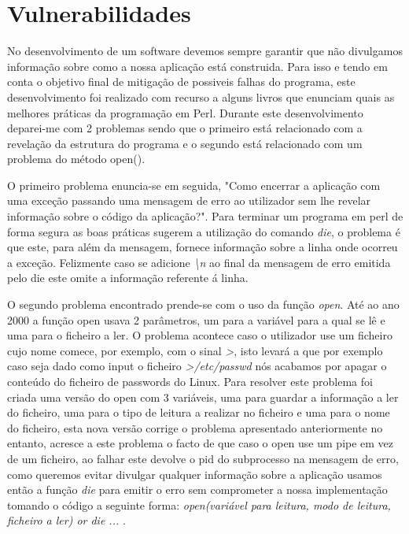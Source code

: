 \section{Vulnerabilidades}

No desenvolvimento de um software devemos sempre garantir que não divulgamos informação sobre como a nossa aplicação está construida. Para isso e tendo em conta o objetivo final de mitigação de possiveis falhas do programa, este desenvolvimento foi realizado com recurso a alguns livros\cite{codeSmells2,livro1,livro2,livro3,livro4,bestpractices} que enunciam quais as melhores práticas da programação em Perl. Durante este desenvolvimento deparei-me com 2 problemas sendo que o primeiro está relacionado com a revelação da estrutura do programa e o segundo está relacionado com um problema do método open().\newline
\par O primeiro problema enuncia-se em seguida, "Como encerrar a aplicação com uma exceção passando uma mensagem de erro ao utilizador sem lhe revelar informação sobre o código da aplicação?". Para terminar um programa em perl de forma segura as boas práticas sugerem a utilização do comando \textit{die}, o problema é que este, para além da mensagem, fornece informação sobre a linha onde ocorreu a exceção. Felizmente caso se adicione \textit{\textbackslash n} ao final da mensagem de erro emitida pelo die este omite a informação referente á linha. 
\par O segundo problema encontrado prende-se com o uso da função \textit{open}. Até ao ano 2000 a função open usava 2 parâmetros, um para a variável para a qual se lê e uma para o ficheiro a ler. O problema  acontece caso o utilizador use um ficheiro cujo nome comece, por exemplo, com o sinal \textit{>}, isto levará a que por exemplo caso seja dado como input o ficheiro \textit{>/etc/passwd} nós acabamos por apagar o conteúdo do ficheiro de passwords do Linux. Para resolver este problema foi criada uma versão do open com 3 variáveis, uma para guardar a informação a ler do ficheiro, uma para o tipo de leitura a realizar no ficheiro e uma para o nome do ficheiro, esta nova versão corrige o problema apresentado anteriormente no entanto, acresce a este problema o facto de que caso o open use um pipe em vez de um ficheiro, ao falhar este devolve o pid do subprocesso na mensagem de erro, como queremos evitar divulgar qualquer informação sobre a aplicação usamos então a função \textit{die} para emitir o erro sem comprometer a nossa implementação tomando o código a seguinte forma: \textit{open(variável para leitura, modo de leitura, ficheiro a ler) or die ... }.\newline

